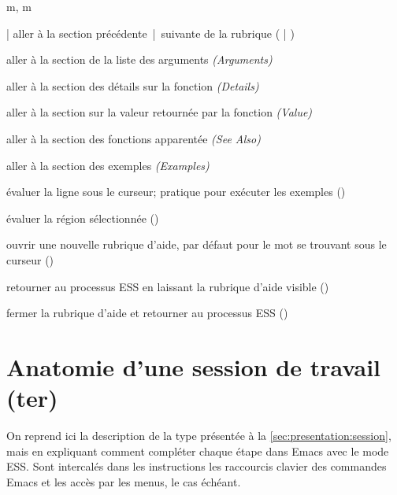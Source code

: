 \begin{ttscript}{m, m}
\item[\code{p} | \code{n}] aller à la section précédente~|~suivante de
  la rubrique \newline
  ( |
  )
\item[\code{s a}] aller à la section de la liste des arguments \emph{(Arguments)}
\item[\code{s D}] aller à la section des détails sur la fonction \emph{(Details)}
\item[\code{s v}] aller à la section sur la valeur retournée par la
  fonction \emph{(Value)}
\item[\code{s s}] aller à la section des fonctions apparentée \emph{(See Also)}
\item[\code{s e}] aller à la section des exemples \emph{(Examples)}
\item[\code{l}] évaluer la ligne sous le curseur; pratique pour
  exécuter les exemples \newline
  ()
\item[\code{r}] évaluer la région sélectionnée ()
\item[\code{h}] ouvrir une nouvelle rubrique d'aide, par défaut pour
  le mot se trouvant sous le curseur
  ()
\item[\code{q}] retourner au processus ESS en laissant la rubrique
  d'aide visible \newline
  ()
\item[\code{x}] fermer la rubrique d'aide et retourner au processus
  ESS \newline
  ()
\end{ttscript}



\section{Anatomie d'une session de travail (ter)}
\label{sec:emacs+ess:session}

On reprend ici la description de la type présentée à la
\autoref{sec:presentation:session}, mais en expliquant comment
compléter chaque étape dans Emacs avec le mode ESS. Sont intercalés
dans les instructions les raccourcis clavier des commandes Emacs et
les accès par les menus, le cas échéant.

